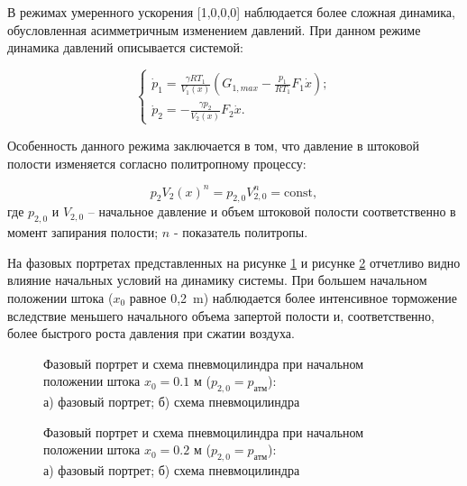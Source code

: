 В режимах умеренного ускорения [1,0,0,0]
наблюдается более сложная динамика, обусловленная асимметричным изменением давлений.
При данном режиме динамика давлений описывается системой:

\begin{equation}
	\begin{cases}
		\dot{p}_1 = \frac{\gamma RT_1}{V_1(x)}\left(G_{1,max} - \frac{p_1}{RT_1}F_1\dot{x}\right); \\
		\dot{p}_2 = -\frac{\gamma p_2}{V_2(x)}F_2\dot{x}.
	\end{cases}
\end{equation}

Особенность данного режима заключается в том, что давление в штоковой полости изменяется согласно политропному процессу:

\begin{equation}
	p_2V_2(x)^n = p_{2,0}V_{2,0}^n = \text{const},
\end{equation}
где $p_{2,0}$ и $V_{2,0}$ -- начальное давление и объем штоковой полости соответственно в момент запирания полости;
$n$ - показатель политропы.

На фазовых портретах представленных на рисунке \ref{fig:pp_moderate_position_1} и рисунке \ref{fig:pp_moderate_position_2}
отчетливо видно влияние начальных условий на динамику системы. При большем начальном положении штока ($x_0$ равное 0,2~\si{\metre}) наблюдается более
интенсивное торможение вследствие меньшего начального объема запертой полости и, соответственно, более быстрого роста давления при сжатии воздуха.


\begin{figure}[htbp]
	\caption{Фазовый портрет и схема пневмоцилиндра при начальном положении штока $x_0 = \num{0.1}$ м ($p_{2,0} = p_\text{атм}$):\\
		а) фазовый портрет; б) схема пневмоцилиндра}
	\label{fig:pp_moderate_position_1}
\end{figure}

\begin{figure}[htbp]
	\caption{Фазовый портрет и схема пневмоцилиндра при начальном положении штока $x_0 = \num{0.2}$ м ($p_{2,0} = p_\text{атм}$):\\
		а) фазовый портрет; б) схема пневмоцилиндра}
	\label{fig:pp_moderate_position_2}
\end{figure}


